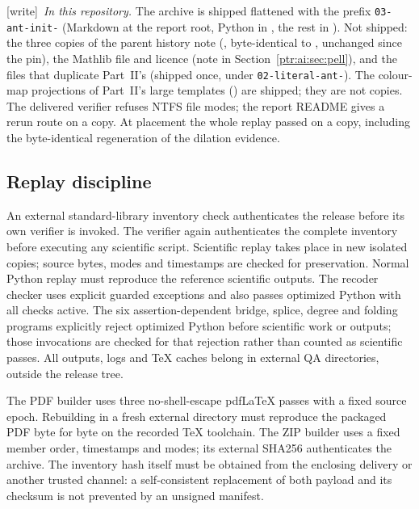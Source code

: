 \documentclass[11pt,letterpaper]{article}
\theoremstyle{definition}\newtheorem{definition}[theorem]{Definition}
\theoremstyle{remark}\newtheorem{remark}[theorem]{Remark}
\newcommand{\wtag}{\textup{[write]}}
\begin{document}
{\small\wtag\ \emph{In this repository.} The archive is shipped flattened
with the prefix \texttt{03-ant-init-} (Markdown at the report root, Python in
, the rest in ). Not shipped: the three copies of the
parent history note (, byte-identical to
,
unchanged since the pin), the Mathlib file and licence (note in
Section~\ref{ptr:ai:sec:pell}), and the files that duplicate Part~II's
(shipped once, under \texttt{02-literal-ant-}). The colour-map projections of
Part~II's large templates () are shipped; they
are not copies. The delivered verifier refuses NTFS file modes; the report
README gives a rerun route on a copy. At placement the whole replay passed on
a copy, including the byte-identical regeneration of the dilation evidence.\par}

\subsection{Replay discipline}
An external standard-library inventory check authenticates the release before its own verifier is invoked. The verifier again authenticates the complete inventory before executing any scientific script. Scientific replay takes place in new isolated copies; source bytes, modes and timestamps are checked for preservation. Normal Python replay must reproduce the reference scientific outputs. The recoder checker uses explicit guarded exceptions and also passes optimized Python with all checks active. The six assertion-dependent bridge, splice, degree and folding programs explicitly reject optimized Python before scientific work or outputs; those invocations are checked for that rejection rather than counted as scientific passes. All outputs, logs and TeX caches belong in external QA directories, outside the release tree.

The PDF builder uses three no-shell-escape pdfLaTeX passes with a fixed source epoch. Rebuilding in a fresh external directory must reproduce the packaged PDF byte for byte on the recorded TeX toolchain. The ZIP builder uses a fixed member order, timestamps and modes; its external SHA256 authenticates the archive. The inventory hash itself must be obtained from the enclosing delivery or another trusted channel: a self-consistent replacement of both payload and its checksum is not prevented by an unsigned manifest.
\end{document}
